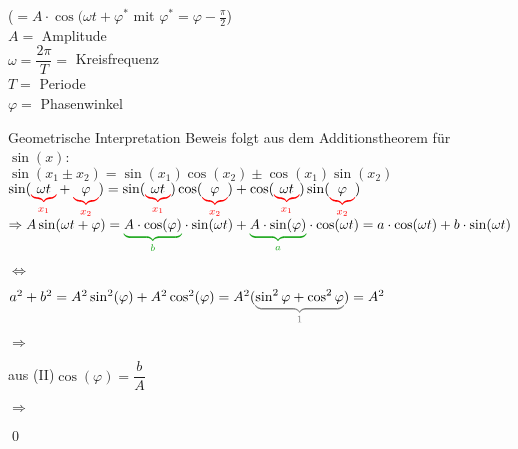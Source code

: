 \hhspace{2cm}\quad($=A\cdot\cos(\omega t+\varphi^*$ mit $\varphi^*=\varphi-\frac{\pi}{2}$)\\
$A=$ Amplitude\\
$\omega=\dfrac{2\pi}{T}=$ Kreisfrequenz\\
$T=$ Periode\\
$\varphi=$ Phasenwinkel


Geometrische Interpretation
\imgplaceholder
Beweis folgt aus dem Additionstheorem für $\sin(x)$:\\
\hhspace{2cm}$\sin(x_1\pm x_2)=\sin(x_1)\cos(x_2)\pm\cos(x_1)\sin(x_2)$\\
$\sin(\redunderbrace{\omega t}{x_1}+\redunderbrace{\varphi}{x_2})=\sin(\redunderbrace{\omega t}{x_1})\cos(\redunderbrace{\varphi}{x_2})+\cos(\redunderbrace{\omega t}{x_1})\sin(\redunderbrace{\varphi}{x_2})$\\
$\Rightarrow A\sin(\omega t+\varphi)=\greenunderbrace{A\cdot\cos(\varphi)}{b}\cdot\sin(\omega t)+\greenunderbrace{A\cdot\sin(\varphi)}{a}\cdot\cos(\omega t)\\
=a\cdot\cos(\omega t)+b\cdot\sin(\omega t)$

\hhspace{2cm}$\Leftrightarrow$ \hfill
{}

$a^2+b^2=A^2\sin^2(\varphi)+A^2\cos^2(\varphi)=A^2(\grayunderbrace{\sin^2\varphi+\cos^2\varphi}{1})=A^2$

\hhspace{2cm}$\Rightarrow$ 

aus (II)\quad$\cos(\varphi)=\dfrac{b}{A}$

\hhspace{2cm}$\Rightarrow$ 

\qed

